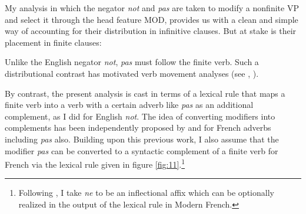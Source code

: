 \documentclass[output=paper]{langsci/langscibook}
\begin{document}
{\begin{exe}
\begin{xlist}
\begin{exe}
\begin{xlist}
My analysis in which the negator \emph{not} and \emph{pas} are taken
to modify a nonfinite VP and select it through the head feature
MOD, provides us with a clean and simple way of accounting for
their distribution in infinitive clauses. But at stake is
their placement in finite clauses:

\eal
{}
\zl

\eal
{}
\zl



\noindent
Unlike the English negator \emph{not}, \emph{pas} must follow the
finite verb. Such a distributional contrast has motivated verb
movement analyses (see \citet{Pollock:89}, \citet{Zanuttini:01}).

By contrast, the present analysis is cast
in terms of a lexical rule that maps a finite verb into a verb
with a certain adverb like \emph{pas} as an additional complement, as
I did for English \emph{not}.  The idea of converting modifiers into
complements has been independently proposed by \citet{Miller92d-u} and
\citet{AG:94} for French adverbs including
\emph{pas} also.  Building upon this
previous work, I also assume that the modifier \emph{pas} can
be converted to a syntactic complement of a
finite verb for French via the lexical rule given
in figure \ref{fig:11}.\footnote{Following \citet{Miller92d-u}, I take \emph{ne} to
be an inflectional affix which can be optionally realized
in the output of the lexical rule in Modern French.}


\end{xlist}
\end{exe}
\end{xlist}
\end{exe}}
\end{document}
